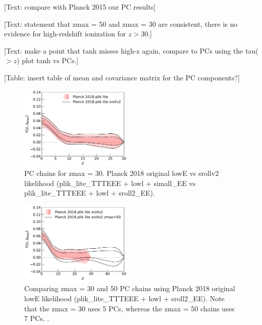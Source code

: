 \documentclass[prd,twocolumn,amsmath,amssymb,floatfix,superscriptaddress,nofootinbib]{revtex4-1}
\begin{document}
[Text: compare with Planck 2015 our PC results]

[Text: statement that zmax = 50 and zmax = 30 are consistent, there is no evidence for high-redshift ionization for $z>30$.]

[Text: make a point that tanh misses high-z again, compare to PCs using the tau($>z$) plot tanh vs PCs.]

[Table: insert table of mean and covariance matrix for the PC components?]


\begin{figure}
\includegraphics[width=0.48\textwidth]{results/direct_mcmc/pl18_plots_zmax30/plot_pub_tau_gtz_dz_0p1_pl18_pc_zmax30_pliklite_post_0930_and_pl18_pc_zmax30_pliklite_srollv2_0930.pdf}
\caption{PC chains for zmax = 30. Planck 2018 original lowE vs srollv2 likelihood (plik\_lite\_TTTEEE + lowl + simall\_EE vs plik\_lite\_TTTEEE + lowl + sroll2\_EE).
}
\label{fig:}
\end{figure}

\begin{figure}
\includegraphics[width=0.48\textwidth]{results/direct_mcmc/pl18_plots_zmax30/plot_pub_tau_gtz_dz_0p1_pl18_pc_zmax30_pliklite_srollv2_0930_and_pl18_pc_zmax50_pliklite_srollv2.pdf}
\caption{Comparing zmax = 30 and 50 PC chains using Planck 2018 original lowE likelihood (plik\_lite\_TTTEEE + lowl + sroll2\_EE). Note that the zmax = 30 uses 5 PCs, whereas the zmax = 50 chains uses 7 PCs. .
}
\label{fig:}
\end{figure}
\end{document}
